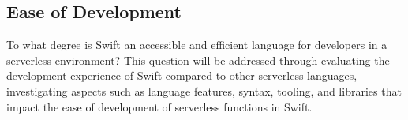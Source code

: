\subsection{Ease of Development}
To what degree is Swift an accessible and efficient language for developers in a serverless environment? This question will be addressed through evaluating the development experience of Swift compared to other serverless languages, investigating aspects such as language features, syntax, tooling, and libraries that impact the ease of development of serverless functions in Swift.



%
